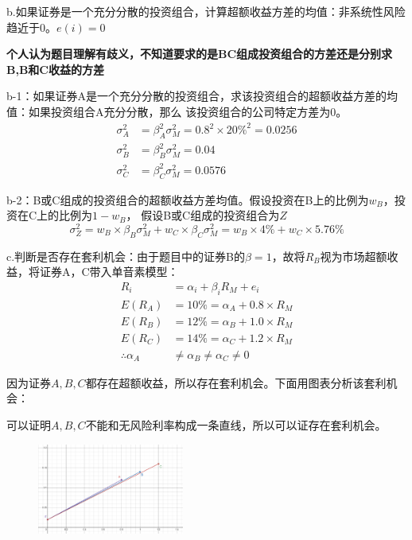 \documentclass{article}
\begin{document}
b.如果证券是一个充分分散的投资组合，计算超额收益方差的均值：非系统性风险趋近于0。$e(i)=0$

\textbf{个人认为题目理解有歧义，不知道要求的是BC组成投资组合的方差还是分别求B,B和C收益的方差}

b-1：如果证券A是一个充分分散的投资组合，求该投资组合的超额收益方差的均值：如果投资组合A充分分散，那么
该投资组合的公司特定方差为0。
\begin{align}
    \sigma_A^2&=\beta_A^2\sigma_M^2=0.8^2\times 20\%^2=0.0256\\
    \sigma_B^2&=\beta_B^2\sigma_M^2=0.04\\
    \sigma_C^2&=\beta_C^2\sigma_M^2=0.0576
\end{align}

b-2：B或C组成的投资组合的超额收益方差均值。假设投资在B上的比例为$w_B$，投资在C上的比例为$1-w_B$，
假设B或C组成的投资组合为$Z$
\[\sigma_Z^2=w_B\times \beta_B\sigma_M^2+w_C\times\beta_C\sigma_M^2=w_B\times 4\%+w_C\times 5.76\%\]

c.判断是否存在套利机会：由于题目中的证券B的$\beta=1$，故将$R_B$视为市场超额收益，将证券A，C带入单音素模型：
\begin{align}
    R_i&=\alpha_i+\beta_iR_M+e_i\\
    E(R_A)&=10\%=\alpha_A+ 0.8\times R_M\\
    E(R_B)&=12\%=\alpha_B+ 1.0\times R_M\\
    E(R_C)&=14\%=\alpha_C+1.2\times R_M\\
    \therefore \alpha_A&\neq \alpha_B\neq \alpha_C\neq 0
\end{align}

因为证券$A,B,C$都存在超额收益，所以存在套利机会。下面用图表分析该套利机会：

可以证明$A,B,C$不能和无风险利率构成一条直线，所以可以证存在套利机会。
\begin{figure}[H]
    \begin{center}
        \includegraphics[width=0.43\textwidth]{2.png}\\
    \end{center}
\end{figure}
\end{document}
